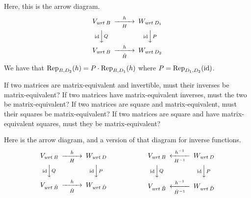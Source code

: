 \begin{exercises}
\begin{answer}
\begin{exparts}
         \partsitem Here, this is the arrow diagram. 
           \begin{equation*}
             \begin{CD}
               V_{\wrt{B}}                   @>h>H>   W_{\wrt{D_1}}       \\
               @V\scriptsize\identity VQV      @V\scriptsize\identity VPV \\
               V_{\wrt{B}}             @>h>\hat{H}>  W_{\wrt{D_2}}
             \end{CD}
           \end{equation*}
           We have that \( \rep{h}{B,D_2}=P\cdot \rep{h}{B,D_1} \) where
           \( P=\rep{\identity}{D_1,D_2} \).
       \end{exparts}  
      \end{answer}
  \item 
    \begin{exparts}
      \partsitem If two matrices are matrix-equivalent and invertible,
        must their
        inverses be matrix-equivalent?
      \partsitem If two matrices have matrix-equivalent inverses, must the two
        be matrix-equivalent?
      \partsitem If two matrices are square and matrix-equivalent, must their
        squares be matrix-equivalent?
      \partsitem If two matrices are square and have matrix-equivalent squares,
        must they be matrix-equivalent?
    \end{exparts}
    \begin{answer}
      \begin{exparts}
        \partsitem Here is the arrow diagram, and a version of that diagram
          for inverse functions.
          \begin{equation*}
           \begin{CD}
             V_{\wrt{B}}                   @>h>H>      W_{\wrt{D}}       \\
             @V\scriptsize\identity VQV       @V\scriptsize\identity VPV \\
             V_{\wrt{\hat{B}}}             @>h>\hat{H}> W_{\wrt{\hat{D}}}
            \end{CD}
            \hspace*{4em}\qquad
           \begin{CD}
             V_{\wrt{B}}              @<h^{-1}<H^{-1}<    W_{\wrt{D}}       \\
             @V\scriptsize\identity VQV       @V\scriptsize\identity VPV \\
             V_{\wrt{\hat{B}}}        @<h^{-1}<\hat{H}^{-1}< W_{\wrt{\hat{D}}}

\end{CD}
\end{equation*}
\end{exparts}
\end{answer}
\end{exercises}
